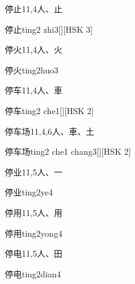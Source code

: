 \begin{entry}{停止}{11,4}{⼈、⽌}
  \begin{phonetics}{停止}{ting2 zhi3}[][HSK 3]
  \end{phonetics}
\end{entry}

\begin{entry}{停火}{11,4}{⼈、⽕}
  \begin{phonetics}{停火}{ting2huo3}
  \end{phonetics}
\end{entry}

\begin{entry}{停车}{11,4}{⼈、⾞}
  \begin{phonetics}{停车}{ting2 che1}[][HSK 2]
  \end{phonetics}
\end{entry}

\begin{entry}{停车场}{11,4,6}{⼈、⾞、⼟}
  \begin{phonetics}{停车场}{ting2 che1 chang3}[][HSK 2]
  \end{phonetics}
\end{entry}

\begin{entry}{停业}{11,5}{⼈、⼀}
  \begin{phonetics}{停业}{ting2ye4}
  \end{phonetics}
\end{entry}

\begin{entry}{停用}{11,5}{⼈、⽤}
  \begin{phonetics}{停用}{ting2yong4}
  \end{phonetics}
\end{entry}

\begin{entry}{停电}{11,5}{⼈、⽥}
  \begin{phonetics}{停电}{ting2dian4}
  \end{phonetics}
\end{entry}

